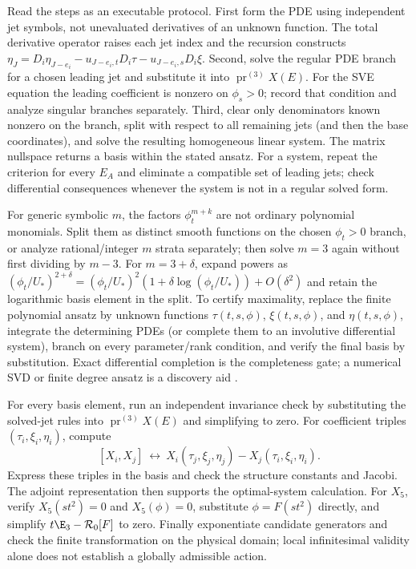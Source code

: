 Read the steps as an executable protocol. First form the PDE using independent
jet symbols, not unevaluated derivatives of an unknown function. The total
derivative operator raises each jet index and the recursion constructs
$\eta_J=D_i\eta_{J-e_i}-u_{J-e_i,t}D_i\tau-u_{J-e_i,s}D_i\xi$.
Second, solve the regular PDE branch for a chosen leading jet and substitute
it into $\operatorname{pr}^{(3)}X(E)$. For the SVE equation the leading
coefficient is nonzero on $\phi_s>0$; record that condition and analyze
singular branches separately. Third, clear only denominators known nonzero on
the branch, split with respect to all remaining jets (and then the base
coordinates), and solve the resulting homogeneous linear system. The matrix
nullspace returns a basis within the stated ansatz. For a system, repeat the
criterion for every $E_A$ and eliminate a compatible set of leading jets;
check differential consequences whenever the system is not in a regular
solved form.

For generic symbolic $m$, the factors $\phi_t^{m+k}$ are not ordinary
polynomial monomials. Split them as distinct smooth functions on the chosen
$\phi_t>0$ branch, or analyze rational/integer $m$ strata separately; then
solve $m=3$ again without first dividing by $m-3$. For
$m=3+\delta$, expand powers as
$(\phi_t/U_*)^{2+\delta}=(\phi_t/U_*)^2(1+\delta\log(\phi_t/U_*))+O(\delta^2)$ and retain the
logarithmic basis element in the split. To certify maximality, replace the
finite polynomial ansatz by unknown functions $\tau(t,s,\phi)$,
$\xi(t,s,\phi)$, and $\eta(t,s,\phi)$, integrate the determining PDEs (or
complete them to an involutive differential system), branch on every
parameter/rank condition, and verify the final basis by substitution. Exact
differential completion is the completeness gate; a numerical SVD or finite
degree ansatz is a discovery aid \cite{approxalg}.

For every basis element, run an independent invariance check by substituting
the solved-jet rules into $\operatorname{pr}^{(3)}X(E)$ and simplifying to
zero. For coefficient triples $(\tau_i,\xi_i,\eta_i)$, compute
\[
 [X_i,X_j]\ \longleftrightarrow\
 X_i(\tau_j,\xi_j,\eta_j)-X_j(\tau_i,\xi_i,\eta_i).
\]
Express these triples in the basis and check the structure constants and Jacobi.
The adjoint
representation then supports the optimal-system calculation. For $X_5$,
verify $X_5(st^2)=0$ and $X_5(\phi)=0$, substitute $\phi=F(st^2)$ directly,
and simplify $t\E_3-\mathcal R_0[F]$ to zero. Finally exponentiate candidate
generators and check the finite transformation on the physical domain; local
infinitesimal validity alone does not establish a globally admissible action.
